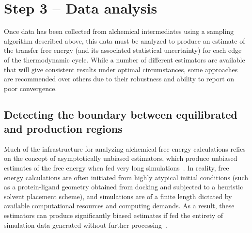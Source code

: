 \documentclass[9pt,bestpractices]{livecoms}
\begin{document}
\section{Step 3 -- Data analysis}
\label{sec:step3}


Once data has been collected from alchemical intermediates using a sampling algorithm described above, this data must be analyzed to produce an estimate of the transfer free energy (and its associated statistical uncertainty) for each edge of the thermodynamic cycle.
While a number of different estimators are available that will give consistent results under optimal circumstances, some approaches are recommended over others due to their robustness and ability to report on poor convergence.

\subsection*{Detecting the boundary between equilibrated and production regions}
\label{sec:automatic-equilibration-detection}

Much of the infrastructure for analyzing alchemical free energy calculations relies on the concept of asymptotically unbiased estimators, which produce unbiased estimates of the free energy when fed very long simulations~\cite{shirts2005comparison}.
In reality, free energy calculations are often initiated from highly atypical initial conditions (such as a protein-ligand geometry obtained from docking and subjected to a heuristic solvent placement scheme), and simulations are of a finite length dictated by available computational resources and computing demands.
As a result, these estimators can produce significantly biased estimates if fed the entirety of simulation data generated without further processing~\cite{chodera2016simple}.
\end{document}
